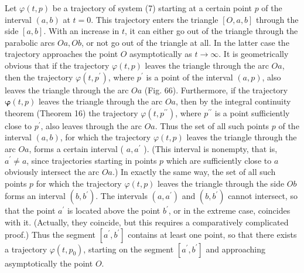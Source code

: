 \documentclass[10pt,a5paper]{book}
\makeatletter
\theoremstyle{plain}
\theoremstyle{definition}
\theoremstyle{remark}
\renewenvironment{proof}[1][\proofname]{\par
  \pushQED{\qed}%
  \normalfont\topsep6\p@\@plus6\p@\relax
  \trivlist
  \item\relax{\itshape #1\@addpunct{.}}\hspace\labelsep\ignorespaces
}{\popQED\endtrivlist\@endpefalse}
\makeatother
\begin{document}
\begin{proof}
Let $\varphi(t, p)$ be a trajectory of system (7) starting at a certain point $p$ of the interval $(a, b)$ at $t=0$. This trajectory enters the triangle $[O, a, b]$
through the side $[a, b]$. With an increase in $t$, it can either go out of the triangle through the parabolic arcs $O a, O b$, or not go out of the triangle at all. In the latter case the trajectory approaches the point $O$ asymptotically as $t \rightarrow \infty$. It is geometrically obvious that if the trajectory $\varphi(t, p)$ leaves the triangle through the arc $O a$, then the trajectory $\varphi\left(t, p^{\prime}\right)$, where $p^{\prime}$ is a point of the interval $(a, p)$, also leaves the triangle through the arc $O a$ (Fig. 66). Furthermore, if the trajectory $\boldsymbol{\varphi}(t, p)$ leaves the triangle through the arc $O a$, then by the integral continuity theorem (Theorem 16) the trajectory $\varphi\left(t, p^{\prime \prime}\right)$, where $p^{\prime \prime}$ is a point sufficiently close to $p^{\prime}$, also leaves through the arc $O a$. Thus the set of all such points $p$ of the interval $(a, b)$, for which the trajectory $\varphi(t, p)$ leaves the triangle through the arc $O a$, forms a certain interval ( $a, a^{\prime}$ ). (This interval is nonempty, that is, $a^{\prime} \neq a$, since trajectories starting in points $p$ which are sufficiently close to $a$ obviously intersect the arc $O a$.) In exactly the same way, the set of all such points $p$ for which the trajectory $\varphi(t, p)$ leaves the triangle through the side $O b$ forms an interval $\left(b, b^{\prime}\right)$. The intervals $\left(a, a^{\prime}\right)$ and $\left(b, b^{\prime}\right)$ cannot intersect, so that the point $a^{\prime}$ is located above the point $b^{\prime}$, or in the extreme case, coincides with it. (Actually, they coincide, but this requires a comparatively complicated proof.) Thus the segment $\left[a^{\prime}, b^{\prime}\right]$ contains at least one point, so that there exists a trajectory $\varphi\left(t, p_{0}\right)$, starting on the segment $\left[a^{\prime}, b^{\prime}\right]$ and approaching asymptotically the point $O$.


\end{proof}
\end{document}

